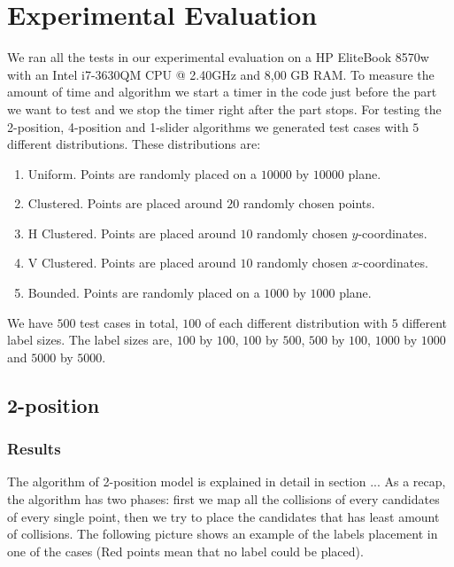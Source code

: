 \documentclass[crop=false,a4paper,oneside,11pt]{standalone}
\begin{document}
\section{Experimental Evaluation}

We ran all the tests in our experimental evaluation on a HP EliteBook 8570w with an Intel i7-3630QM CPU @ 2.40GHz and 8,00 GB RAM. To measure the amount of time and algorithm we start a timer in the code just before the part we want to test and we stop the timer right after the part stops. For testing the 2-position, 4-position and 1-slider algorithms we generated test cases with $5$ different distributions. These distributions are:
\begin{enumerate}
    \item Uniform. Points are randomly placed on a $10000$ by $10000$ plane.
    \item Clustered. Points are placed around $20$ randomly chosen points.
    \item H Clustered. Points are placed around $10$ randomly chosen $y$-coordinates.
    \item V Clustered. Points are placed around $10$ randomly chosen $x$-coordinates.
    \item Bounded. Points are randomly placed on a $1000$ by $1000$ plane.
\end{enumerate}
We have $500$ test cases in total, $100$ of each different distribution with $5$ different label sizes. The label sizes are, $100$ by $100$, $100$ by $500$, $500$ by $100$, $1000$ by $1000$ and $5000$ by $5000$.

\subsection{2-position}
\subsubsection{Results}
The algorithm of 2-position model is explained in detail in section ... As a recap, the algorithm has two phases: first we map all the collisions of every candidates of every single point, then we try to place the candidates that has least amount of collisions. The following picture shows an example of the labels placement in one of the cases (Red points mean that no label could be placed).
\end{document}
